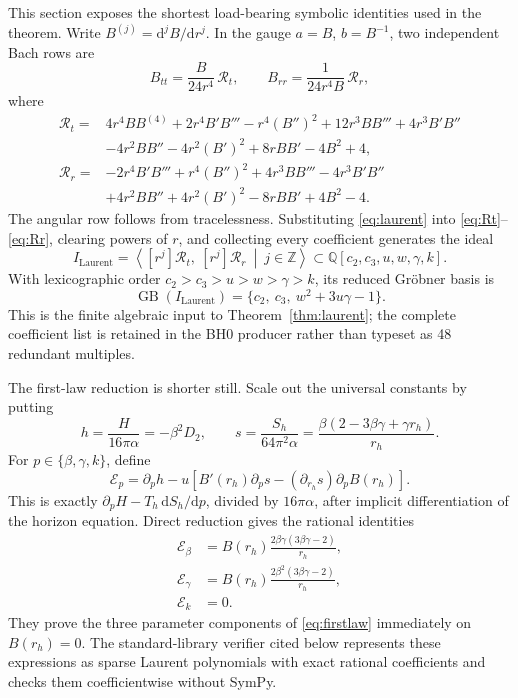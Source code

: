 \documentclass[11pt]{article}
\theoremstyle{definition}
\theoremstyle{remark}
\newcommand{\dd}{\mathrm d}
\begin{document}
This section exposes the shortest load-bearing symbolic identities used in
the theorem.  Write \(B^{(j)}=\dd^jB/\dd r^j\).  In the gauge \(a=B\),
\(b=B^{-1}\), two independent Bach rows are
\begin{equation}
 B_{tt}=\frac{B}{24r^4}\,\mathcal R_t,\qquad
 B_{rr}=\frac{1}{24r^4B}\,\mathcal R_r,
\end{equation}
where
\begin{align}
\mathcal R_t={}&
 4r^4BB^{(4)}+2r^4B'B'''-r^4(B'')^2
+12r^3BB'''+4r^3B'B'' \nonumber\\
&-4r^2BB''-4r^2(B')^2+8rBB'-4B^2+4,\label{eq:Rt}\\
\mathcal R_r={}&
-2r^4B'B'''+r^4(B'')^2+4r^3BB'''-4r^3B'B'' \nonumber\\
&+4r^2BB''+4r^2(B')^2-8rBB'+4B^2-4.\label{eq:Rr}
\end{align}
The angular row follows from tracelessness.  Substituting
\eqref{eq:laurent} into \eqref{eq:Rt}--\eqref{eq:Rr}, clearing powers of
\(r\), and collecting every coefficient generates the ideal
\[
 I_{\mathrm{Laurent}}
 =\left\langle [r^j]\mathcal R_t,\ [r^j]\mathcal R_r
   \ \middle|\ j\in\mathbb Z\right\rangle
 \subset\mathbb Q[c_2,c_3,u,w,\gamma,k].
\]
With lexicographic order \(c_2>c_3>u>w>\gamma>k\), its reduced
Gr\"obner basis is
\begin{equation}
 \operatorname{GB}(I_{\mathrm{Laurent}})
 =\{c_2,\ c_3,\ w^2+3u\gamma-1\}.
\end{equation}
This is the finite algebraic input to
Theorem~\ref{thm:laurent}; the complete coefficient list is retained in the
BH0 producer rather than typeset as 48 redundant multiples.

The first-law reduction is shorter still.  Scale out the universal
constants by putting
\begin{equation}
 h=\frac{H}{16\pi\alpha}=-\beta^2D_2,\qquad
 s=\frac{S_h}{64\pi^2\alpha}
   =\frac{\beta(2-3\beta\gamma+\gamma r_h)}{r_h}.
\end{equation}
For \(p\in\{\beta,\gamma,k\}\), define
\begin{equation}
 \mathcal E_p
 =\partial_ph-u\left[B'(r_h)\partial_ps
       -(\partial_{r_h}s)\partial_pB(r_h)\right].
\end{equation}
This is exactly
\(\partial_pH-T_h\,\dd S_h/\dd p\), divided by \(16\pi\alpha\), after
implicit differentiation of the horizon equation.  Direct reduction gives
the rational identities
\begin{align}
 \mathcal E_\beta
 &=B(r_h)\frac{2\beta\gamma(3\beta\gamma-2)}{r_h},\\
 \mathcal E_\gamma
 &=B(r_h)\frac{2\beta^2(3\beta\gamma-2)}{r_h},\\
 \mathcal E_k&=0.
\end{align}
They prove the three parameter components of
\eqref{eq:firstlaw} immediately on \(B(r_h)=0\).  The standard-library
verifier cited below represents these expressions as sparse Laurent
polynomials with exact rational coefficients and checks them
coefficientwise without SymPy.
\end{document}
